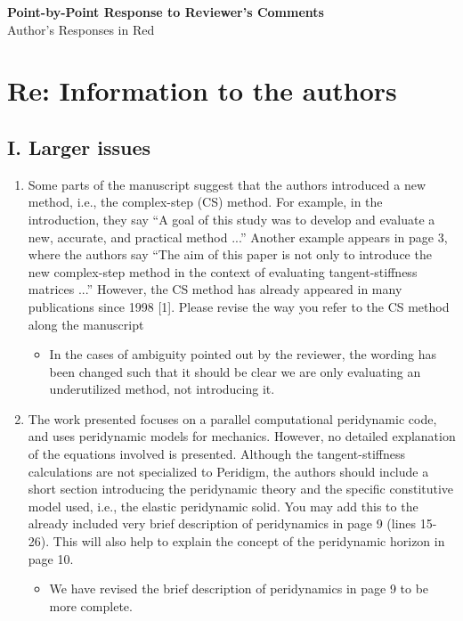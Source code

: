 \documentclass{article}
\begin{document}
\begin{center}
    {\LARGE \bf Point-by-Point Response to Reviewer's Comments} \\
     Author's Responses in {\color{red} Red}
\end{center}

\section*{Re: Information to the authors}
%
\subsection*{I. Larger issues}
%
\begin{enumerate}
    \item Some parts of the manuscript suggest that the authors introduced a new method, i.e., the complex-step (CS) method. For example, in the introduction, they say ``A goal of this study was to develop and evaluate a new, accurate, and practical method ...'' Another example appears in page 3, where the authors say ``The aim of this paper is not only to introduce the new complex-step method in the context of evaluating tangent-stiffness matrices ...'' However, the CS method has already appeared in many publications since 1998 [1]. Please revise the way you refer to the CS method along the manuscript

{\color{red}
  \begin{itemize}
      \item In the cases of ambiguity pointed out by the reviewer, the wording has been changed such that it should be clear we are only evaluating an underutilized method, not introducing it.
  \end{itemize}
}
    \item
        The work presented focuses on a parallel computational peridynamic code, and
        uses peridynamic models for mechanics. However, no detailed explanation of the
        equations involved is presented. Although the tangent-stiffness calculations are
        not specialized to Peridigm, the authors should include a short section introducing
        the peridynamic theory and the specific constitutive model used, i.e., the elastic
        peridynamic solid. You may add this to the already included very brief description
        of peridynamics in page 9 (lines 15-26). This will also help to explain the concept
        of the peridynamic horizon in page 10.

{\color{red}
  \begin{itemize}
    \item 
        We have revised the brief description of peridynamics in page 9 to be more complete.
  \end{itemize}}


\end{enumerate}
\end{document}
